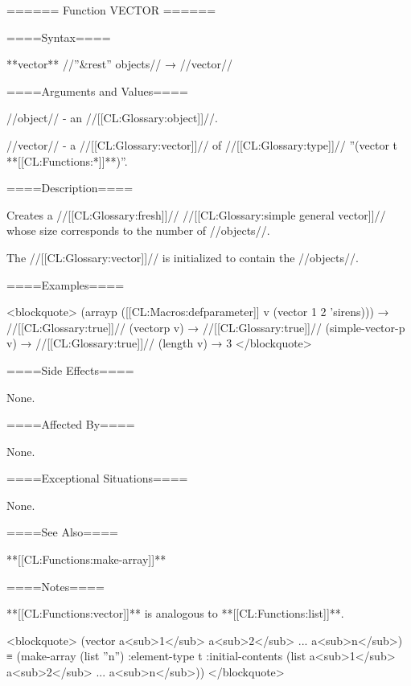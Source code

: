 ====== Function VECTOR ======

====Syntax====

**vector** //''&rest'' objects// → //vector//

====Arguments and Values====

//object// - an //[[CL:Glossary:object]]//.

//vector// - a //[[CL:Glossary:vector]]// of //[[CL:Glossary:type]]// ''(vector t **[[CL:Functions:*]]**)''.

====Description====

Creates a //[[CL:Glossary:fresh]]// //[[CL:Glossary:simple general vector]]// whose size corresponds to the number of //objects//.

The //[[CL:Glossary:vector]]// is initialized to contain the //objects//.

====Examples====

<blockquote> (arrayp ([[CL:Macros:defparameter]] v (vector 1 2 'sirens))) → //[[CL:Glossary:true]]// (vectorp v) → //[[CL:Glossary:true]]// (simple-vector-p v) → //[[CL:Glossary:true]]// (length v) → 3 </blockquote>

====Side Effects====

None.

====Affected By====

None.

====Exceptional Situations====

None.

====See Also====

**[[CL:Functions:make-array]]**

====Notes====

**[[CL:Functions:vector]]** is analogous to **[[CL:Functions:list]]**.

<blockquote> (vector a<sub>1</sub> a<sub>2</sub> ... a<sub>n</sub>) ≡ (make-array (list ''n'') :element-type t :initial-contents (list a<sub>1</sub> a<sub>2</sub> ... a<sub>n</sub>)) </blockquote>

